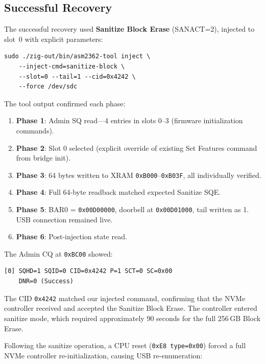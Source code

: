 \documentclass[conference]{IEEEtran}
\begin{document}
\subsection{Successful Recovery}
\label{sec:success}

The successful recovery used \textbf{Sanitize Block Erase} (SANACT=2),
injected to slot~0 with explicit parameters:

\begin{lstlisting}[style=shell,caption={Successful Sanitize Block Erase
injection command.},label={lst:success-cmd}]
sudo ./zig-out/bin/asm2362-tool inject \
    --inject-cmd=sanitize-block \
    --slot=0 --tail=1 --cid=0x4242 \
    --force /dev/sdc
\end{lstlisting}

The tool output confirmed each phase:
\begin{enumerate}
\item \textbf{Phase 1}: Admin SQ read---4 entries in slots 0--3
  (firmware initialization commands).
\item \textbf{Phase 2}: Slot 0 selected (explicit override of existing
  Set Features command from bridge init).
\item \textbf{Phase 3}: 64 bytes written to XRAM
  \texttt{0xB000}--\texttt{0xB03F}, all individually verified.
\item \textbf{Phase 4}: Full 64-byte readback matched expected
  Sanitize SQE.
\item \textbf{Phase 5}: BAR0 = \texttt{0x00D00000}, doorbell at
  \texttt{0x00D01000}, tail written as 1. USB connection remained live.
\item \textbf{Phase 6}: Post-injection state read.
\end{enumerate}

The Admin CQ at \texttt{0xBC00} showed:

\begin{lstlisting}[style=hex,caption={Admin CQ entry confirming Sanitize
acceptance.},label={lst:cq-result}]
[0] SQHD=1 SQID=0 CID=0x4242 P=1 SCT=0 SC=0x00
    DNR=0 (Success)
\end{lstlisting}

The CID \texttt{0x4242} matched our injected command, confirming that
the NVMe controller received and accepted the Sanitize Block Erase. The
controller entered sanitize mode, which required approximately 90
seconds for the full 256\,GB Block Erase.

Following the sanitize operation, a CPU reset (\texttt{0xE8 type=0x00})
forced a full NVMe controller re-initialization, causing USB
re-enumeration:
\end{document}
